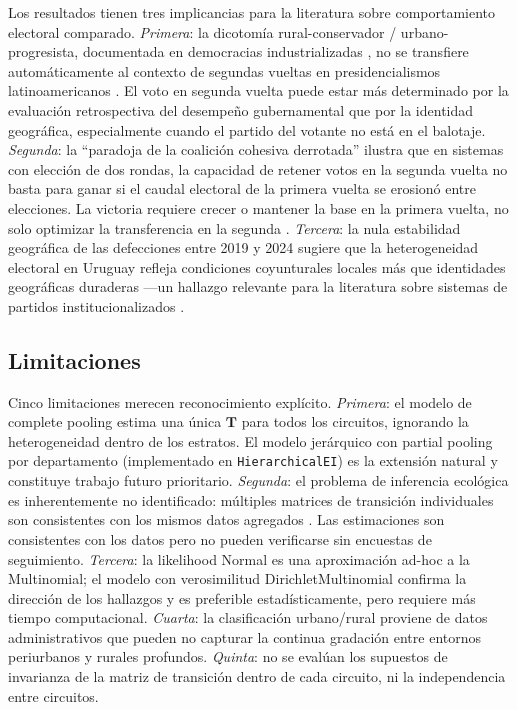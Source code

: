 Los resultados tienen tres implicancias para la literatura sobre comportamiento electoral comparado. \textit{Primera}: la dicotomía rural-conservador / urbano-progresista, documentada en democracias industrializadas \citep{rodden2019s}, no se transfiere automáticamente al contexto de segundas vueltas en presidencialismos latinoamericanos \citep{chasquetti2004democracia}. El voto en segunda vuelta puede estar más determinado por la evaluación retrospectiva del desempeño gubernamental \citep{downs1957economic} que por la identidad geográfica, especialmente cuando el partido del votante no está en el balotaje. \textit{Segunda}: la ``paradoja de la coalición cohesiva derrotada'' ilustra que en sistemas con elección de dos rondas, la capacidad de retener votos en la segunda vuelta no basta para ganar si el caudal electoral de la primera vuelta se erosionó entre elecciones. La victoria requiere crecer o mantener la base en la primera vuelta, no solo optimizar la transferencia en la segunda \citep{birch2003tworound}. \textit{Tercera}: la nula estabilidad geográfica de las defecciones entre 2019 y 2024 sugiere que la heterogeneidad electoral en Uruguay refleja condiciones coyunturales locales más que identidades geográficas duraderas ---un hallazgo relevante para la literatura sobre sistemas de partidos institucionalizados \citep{mainwaring1995party, luna2014segmented}.

\subsection{Limitaciones}

Cinco limitaciones merecen reconocimiento explícito. \textit{Primera}: el modelo de complete pooling estima una única $\mathbf{T}$ para todos los circuitos, ignorando la heterogeneidad dentro de los estratos. El modelo jerárquico con partial pooling por departamento (implementado en \texttt{HierarchicalEI}) es la extensión natural y constituye trabajo futuro prioritario. \textit{Segunda}: el problema de inferencia ecológica es inherentemente no identificado: múltiples matrices de transición individuales son consistentes con los mismos datos agregados \citep{king1997, greiner2009rxc}. Las estimaciones son consistentes con los datos pero no pueden verificarse sin encuestas de seguimiento. \textit{Tercera}: la likelihood Normal es una aproximación ad-hoc a la Multinomial; el modelo con verosimilitud DirichletMultinomial \citep{mosimann1962compound} confirma la dirección de los hallazgos y es preferible estadísticamente, pero requiere más tiempo computacional. \textit{Cuarta}: la clasificación urbano/rural proviene de datos administrativos que pueden no capturar la continua gradación entre entornos periurbanos y rurales profundos. \textit{Quinta}: no se evalúan los supuestos de invarianza de la matriz de transición dentro de cada circuito, ni la independencia entre circuitos.

